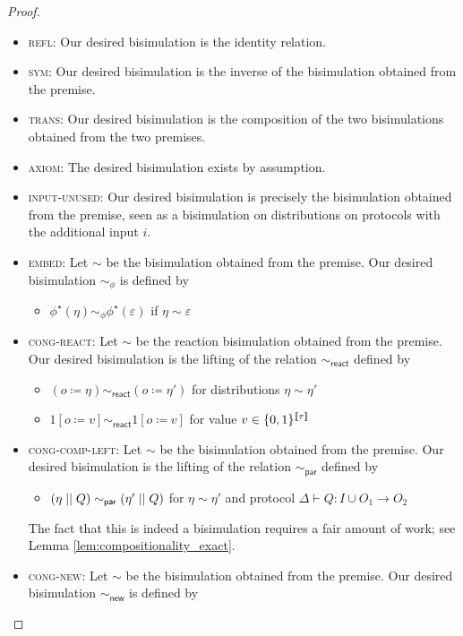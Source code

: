 \begin{proof}
\begin{itemize}
\item \textsc{refl}: Our desired bisimulation is the identity relation.
\item \textsc{sym}: Our desired bisimulation is the inverse of the bisimulation obtained from the premise.
\item \textsc{trans}: Our desired bisimulation is the composition of the two bisimulations obtained from the two premises.
\item \textsc{axiom}: The desired bisimulation exists by assumption.
\item \textsc{input-unused}: Our desired bisimulation is precisely the bisimulation obtained from the premise, seen as a bisimulation on distributions on protocols with the additional input $i$.
\item \textsc{embed}: Let $\sim$ be the bisimulation obtained from the premise. Our desired bisimulation $\sim_\phi$ is defined by
\begin{itemize}
\item $\phi^\star(\eta) \sim_\phi \phi^\star(\varepsilon)$ if $\eta \sim \varepsilon$
\end{itemize}
\item \textsc{cong-react}: Let $\sim$ be the reaction bisimulation obtained from the premise. Our desired bisimulation is the lifting of the relation $\sim_{\mathsf{react}}$ defined by
\begin{itemize}
\item $(o \coloneqq \eta) \sim_{\mathsf{react}} (o \coloneqq \eta')$ for distributions $\eta \sim \eta'$
\item $1[o \coloneqq v] \sim_{\mathsf{react}} 1[o \coloneqq v]$ for  value $v \in \{0,1\}^{\llbracket \tau \rrbracket}$
\end{itemize}
\item \textsc{cong-comp-left}: Let $\sim$ be the bisimulation obtained from the premise. Our desired bisimulation is the lifting of the relation $\sim_{\mathsf{par}}$ defined by
\begin{itemize}
\item $(\eta \; || \; Q) \sim_{\mathsf{par}} (\eta' \; || \; Q)$ for $\eta \sim \eta'$ and protocol $\Delta \vdash Q : I \cup O_1 \to O_2$
\end{itemize}
The fact that this is indeed a bisimulation requires a fair amount of work; see Lemma \ref{lem:compositionality_exact}.
\item \textsc{cong-new}: Let $\sim$ be the bisimulation obtained from the premise. Our desired bisimulation $\sim_{\mathsf{new}}$ is defined by

\end{itemize}
\end{proof}
